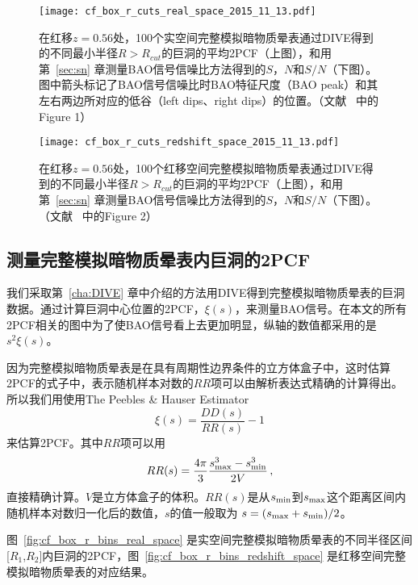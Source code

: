 \begin{figure}
\centering
\texttt{[image: cf\_box\_r\_cuts\_real\_space\_2015\_11\_13.pdf]}
\caption{在红移$z = 0.56$处，100个实空间完整模拟暗物质晕表通过DIVE得到的不同最小半径$R > R_{cut}$的巨洞的平均2PCF（上图），和用第~\ref{sec:sn} 章测量BAO信号信噪比方法得到的$S$，$N$和$S/N$（下图）。图中箭头标记了BAO信号信噪比时BAO特征尺度（BAO peak）和其左右两边所对应的低谷（left dips、right dips）的位置。（文献 ~中的Figure 1）}
\label{fig:cf_box_r_cuts_real_space}
\end{figure}

\begin{figure}
\centering
\texttt{[image: cf\_box\_r\_cuts\_redshift\_space\_2015\_11\_13.pdf]}
\caption{在红移$z = 0.56$处，100个红移空间完整模拟暗物质晕表通过DIVE得到的不同最小半径$R > R_{cut}$的巨洞的平均2PCF（上图），和用第~\ref{sec:sn} 章测量BAO信号信噪比方法得到的$S$，$N$和$S/N$（下图）。（文献 ~中的Figure 2）}
\label{fig:cf_box_r_cuts_redshift_space}
\end{figure}

\subsection{测量完整模拟暗物质晕表内巨洞的2PCF}

我们采取第~\ref{cha:DIVE} 章中介绍的方法用DIVE得到完整模拟暗物质晕表的巨洞数据。通过计算巨洞中心位置的2PCF，$\xi(s)$，来测量BAO信号。在本文的所有2PCF相关的图中为了使BAO信号看上去更加明显，纵轴的数值都采用的是$s^2 \xi(s)$。

因为完整模拟暗物质晕表是在具有周期性边界条件的立方体盒子中，这时估算2PCF的式子中，表示随机样本对数的$RR$项可以由解析表达式精确的计算得出。所以我们用使用The Peebles \& Hauser Estimator~\cite{Peebles1974}
\begin{equation}
\xi (s)=\frac {DD(s)} {RR(s)} - 1
\end{equation}
来估算2PCF。其中$RR$项可以用
\begin{equation}
RR(s) = \frac{4\pi}{3}  \frac {s_{\rm max}^3 - s_{\rm min}^3}{2V}\,,
\end{equation}
直接精确计算。$V$是立方体盒子的体积。$RR(s)$是从$s_{\rm min}$到$s_{\rm max}$这个距离区间内随机样本对数归一化后的数值，$s$的值一般取为
$
s = (s_{\rm max} + s_{\rm min})/2
$。

图~\ref{fig:cf_box_r_bins_real_space} 是实空间完整模拟暗物质晕表的不同半径区间[$R_1$,$R_2$]内巨洞的2PCF，图~\ref{fig:cf_box_r_bins_redshift_space} 是红移空间完整模拟暗物质晕表的对应结果。

